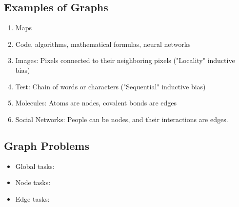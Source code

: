 \subsection{Examples of Graphs}
\begin{example}
    \begin{enumerate}
        \item Maps
        \item Code, algorithms, mathematical formulas, neural networks 
        \item Images: Pixels connected to their neighboring pixels ("Locality" inductive bias)
        \item Test: Chain of words or characters ("Sequential" inductive bias)
        \item Molecules: Atoms are nodes, covalent bonds are edges
        \item Social Networks: People can be nodes, and their interactions are edges. 
    \end{enumerate}
\end{example}
\newpage

\subsection{Graph Problems}
\begin{notes}
    \begin{itemize}
        \item Global tasks:
        \item Node tasks:
        \item Edge tasks:
    \end{itemize}
\end{notes}
\newpage

